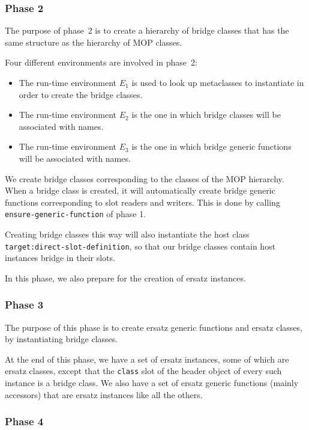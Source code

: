 \subsubsection{Phase 2}

The purpose of phase~2 is to create a hierarchy of bridge classes that
has the same structure as the hierarchy of MOP classes.

Four different environments are involved in phase~2:

\begin{itemize}
\item The run-time environment $E_1$ is used to look up metaclasses to
  instantiate in order to create the bridge classes.
\item The run-time environment $E_2$ is the one in which bridge
  classes will be associated with names.
\item The run-time environment $E_3$ is the one in which bridge
  generic functions will be associated with names.
\end{itemize}

We create bridge classes corresponding to the classes of the MOP
hierarchy.  When a bridge class is created, it will automatically
create bridge generic functions corresponding to slot readers and
writers.  This is done by calling \texttt{ensure-generic-function} of
phase 1.

Creating bridge classes this way will also instantiate the host class
\texttt{target:direct-slot-definition}, so that our bridge classes
contain host instances bridge in their slots. 

In this phase, we also prepare for the creation of ersatz instances.

\subsubsection{Phase 3}

The purpose of this phase is to create ersatz generic functions and
ersatz classes, by instantiating bridge classes.  

At the end of this phase, we have a set of ersatz instances, some of
which are ersatz classes, except that the \texttt{class} slot of the
header object of every such instance is a bridge class.  We also have
a set of ersatz generic functions (mainly accessors) that are ersatz
instances like all the others. 

\subsubsection{Phase 4}

